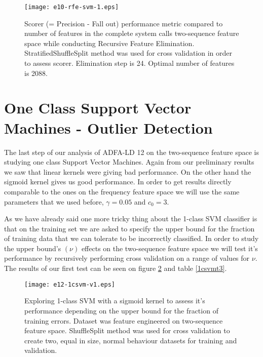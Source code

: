 \documentclass[reqno,openany,12pt]{amsbook}
\begin{document}
\begin{figure}[thb]
\texttt{[image: e10-rfe-svm-1.eps]}
\caption[Recursive Feature Elimination in the two-sequence feature space.]{Scorer (= Precision - Fall out) performance metric compared to number of features in the complete system calls two-sequence feature space while conducting Recursive Feature Elimination. StratifiedShuffleSplit method was used for cross validation in order to assess scorer. Elimination step is 24. Optimal number of features is 2088.}
\label{svm-sq1}
\end{figure}

%
%
\section{One Class Support Vector Machines - Outlier Detection}

The last step of our analysis of ADFA-LD 12 on the two-sequence feature space is studying one class Support Vector Machines. Again from our preliminary results we saw that linear kernels were giving bad performance. On the other hand the sigmoid kernel gives us good performance. In order to get results directly comparable to the ones on the frequency feature space we will use the same parameters that we used before, $\gamma = 0.05$ and $c_0 = 3$. 

As we have already said one more tricky thing about the 1-class SVM classifier is that on the training set we are asked to specify the upper bound for the fraction of training data that we can tolerate to be incorrectly classified. In order to study the upper bound's $(\nu)$ effects on the two-sequence feature space we will test it's performance by recursively performing cross validation on a range of values for $\nu$. The results of our first test can be seen on figure \ref{1csvm-sq1} and table \ref{1csvmt3}.


\begin{figure}[th]
\texttt{[image: e12-1csvm-v1.eps]}
\caption[1-class SVM performance depending on bound for training errors]{Exploring 1-class SVM with a sigmoid kernel to assess it's performance depending on the upper bound for the fraction of training errors. Dataset was feature engineered on two-sequence feature space. ShuffleSplit method was used for cross validation to create two, equal in size, normal behaviour datasets for training and validation.}
\label{1csvm-sq1}
\end{figure}
\end{document}
